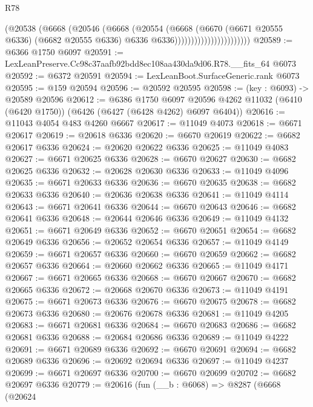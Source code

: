 \begin{lexlean}{R78}
\begin{coremodule}
                                    (@20538
                                      (@6668
                                        (@20546
                                          (@6668
                                            (@20554
                                              (@6668
                                                (@6670
                                                  (@6671 @20555 @6336)
                                                  (@6682 @20555 @6336)
                                                  @6336
                                                  @6336)))))))))))))))))))))))
@20589 := @6366 @1750 @6097
@20591 := LexLeanPreserve.Cc98c37aafb92bdd8ec108aa430da9d06.R78.__fits_64 @6073
@20592 := @6372 @20591
@20594 := LexLeanBoot.SurfaceGeneric.rank @6073
@20595 := @159 @20594
@20596 := @20592 @20595
@20598 := (key : @6093) -> @20589 @20596
@20612 := @6386
    @1750
    @6097
    @20596
    @4262
    @11032
    (@6410 (@6420 @1750))
    (@6426 (@6427 (@6428 @4262) @6097 @6404))
@20616 := @11043 @4054 @483 @4260 @6667
@20617 := @11049 @4073
@20618 := @6671 @20617
@20619 := @20618 @6336
@20620 := @6670 @20619
@20622 := @6682 @20617 @6336
@20624 := @20620 @20622 @6336
@20625 := @11049 @4083
@20627 := @6671 @20625 @6336
@20628 := @6670 @20627
@20630 := @6682 @20625 @6336
@20632 := @20628 @20630 @6336
@20633 := @11049 @4096
@20635 := @6671 @20633 @6336
@20636 := @6670 @20635
@20638 := @6682 @20633 @6336
@20640 := @20636 @20638 @6336
@20641 := @11049 @4114
@20643 := @6671 @20641 @6336
@20644 := @6670 @20643
@20646 := @6682 @20641 @6336
@20648 := @20644 @20646 @6336
@20649 := @11049 @4132
@20651 := @6671 @20649 @6336
@20652 := @6670 @20651
@20654 := @6682 @20649 @6336
@20656 := @20652 @20654 @6336
@20657 := @11049 @4149
@20659 := @6671 @20657 @6336
@20660 := @6670 @20659
@20662 := @6682 @20657 @6336
@20664 := @20660 @20662 @6336
@20665 := @11049 @4171
@20667 := @6671 @20665 @6336
@20668 := @6670 @20667
@20670 := @6682 @20665 @6336
@20672 := @20668 @20670 @6336
@20673 := @11049 @4191
@20675 := @6671 @20673 @6336
@20676 := @6670 @20675
@20678 := @6682 @20673 @6336
@20680 := @20676 @20678 @6336
@20681 := @11049 @4205
@20683 := @6671 @20681 @6336
@20684 := @6670 @20683
@20686 := @6682 @20681 @6336
@20688 := @20684 @20686 @6336
@20689 := @11049 @4222
@20691 := @6671 @20689 @6336
@20692 := @6670 @20691
@20694 := @6682 @20689 @6336
@20696 := @20692 @20694 @6336
@20697 := @11049 @4237
@20699 := @6671 @20697 @6336
@20700 := @6670 @20699
@20702 := @6682 @20697 @6336
@20779 := @20616
    (fun (__b : @6068) =>
    @8287
      (@6668
        (@20624

\end{coremodule}
\end{lexlean}

